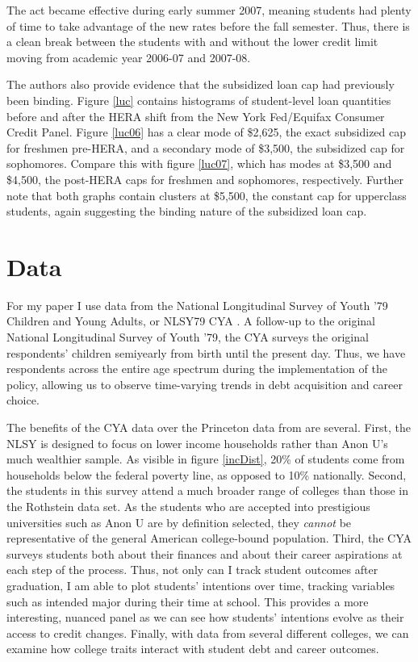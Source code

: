 \documentclass{article}
\begin{document}
	The act became effective during early summer 2007, meaning students had plenty of time to take advantage of the new rates before the fall semester. Thus, there is a clean break between the students with and without the lower credit limit moving from academic year 2006-07 and 2007-08.
	
	The authors also provide evidence that the subsidized loan cap had previously been binding. Figure \ref{luc} contains histograms of student-level loan quantities before and after the HERA shift from the New York Fed/Equifax Consumer Credit Panel. Figure \ref{luc06} has a clear mode of \$2,625, the exact subsidized cap for freshmen pre-HERA, and a secondary mode of \$3,500, the subsidized cap for sophomores. Compare this with figure \ref{luc07}, which has modes at \$3,500 and \$4,500, the post-HERA caps for freshmen and sophomores, respectively. Further note that both graphs contain clusters at \$5,500, the constant cap for upperclass students, again suggesting the binding nature of the subsidized loan cap. 
	
	
	\section{Data}
	
	For my paper I use data from the National Longitudinal Survey of Youth '79 Children and Young Adults, or NLSY79 CYA \parencite{bls2018}. A follow-up to the original National Longitudinal Survey of Youth '79, the CYA surveys the original respondents' children semiyearly from birth until the present day. Thus, we have respondents across the entire age spectrum during the implementation of the policy, allowing us to observe time-varying trends in debt acquisition and career choice. 
	
	The benefits of the CYA data over the Princeton data from \textcite{rothstein2011} are several. First, the NLSY is designed to focus on lower income households rather than Anon U's much wealthier sample. As visible in figure \ref{incDist}, 20\% of students come from households below the federal poverty line, as opposed to 10\% nationally. Second, the students in this survey attend a much broader range of colleges than those in the Rothstein data set. As the students who are accepted into prestigious universities such as Anon U are by definition selected, they \emph{cannot} be representative of the general American college-bound population. Third, the CYA surveys students both about their finances and about their career aspirations at each step of the process. Thus, not only can I track student outcomes after graduation, I am able to plot students' intentions over time, tracking variables such as intended major during their time at school. This provides a more interesting, nuanced panel as we can see how students' intentions evolve as their access to credit changes. Finally, with data from several different colleges, we can examine how college traits interact with student debt and career outcomes. 
	
\end{document}
